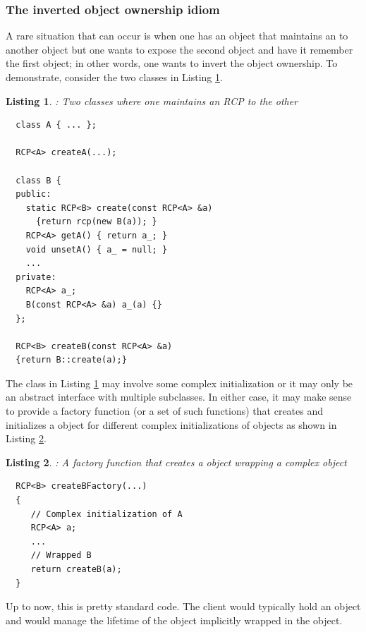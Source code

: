 \documentclass[pdf,ps2pdf,11pt]{SANDreport}
\newtheorem{listing}{Listing}
\begin{document}
%
{}\subsubsection{The inverted object ownership idiom}
\label{sec:inverting-obj-ownership}
%

A rare situation that can occur is when one has an object that
maintains an {} to another object but one wants to expose the
second object and have it remember the first object; in other words,
one wants to invert the object ownership.  To demonstrate, consider
the two classes in Listing {}\ref{listing:B_owns_A_decl}.

\begin{listing}: Two classes where one maintains an RCP to the other \\
\label{listing:B_owns_A_decl}
{\small\begin{verbatim}
  class A { ... };

  RCP<A> createA(...);

  class B {
  public:
    static RCP<B> create(const RCP<A> &a)
      {return rcp(new B(a)); }
    RCP<A> getA() { return a_; }
    void unsetA() { a_ = null; }
    ...
  private:
    RCP<A> a_;
    B(const RCP<A> &a) a_(a) {}
  };

  RCP<B> createB(const RCP<A> &a)
  {return B::create(a);}
\end{verbatim}}
\end{listing}

The class {} in Listing {}\ref{listing:B_owns_A_decl} may
involve some complex initialization or it may only be an abstract
interface with multiple subclasses.  In either case, it may make sense
to provide a factory function (or a set of such functions) that
creates and initializes a {} object for different complex
initializations of {} objects as shown in Listing
{}\ref{listing:createBFactory}.

\begin{listing}: A factory function that creates a {} object
wrapping a complex {} object \\
\label{listing:createBFactory}
{\small\begin{verbatim}
  RCP<B> createBFactory(...)
  {
     // Complex initialization of A
     RCP<A> a;
     ...
     // Wrapped B
     return createB(a);
  }
\end{verbatim}}
\end{listing}

Up to now, this is pretty standard code.  The client would typically hold an
{} object and would manage the lifetime of the {} object
implicitly wrapped in the {} object.
\end{document}
